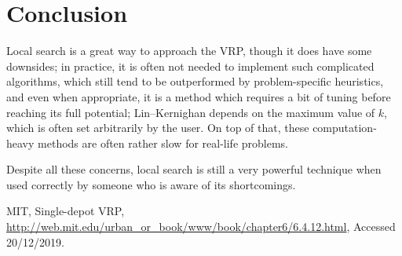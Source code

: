 \documentclass[journal]{IEEEtran}
\begin{document}
\section{Conclusion}
Local search is a great way to approach the VRP, though it does have some downsides; in practice, it is often not needed to implement such complicated algorithms, which still tend to be outperformed by problem-specific heuristics, and even when appropriate, it is a method which requires a bit of tuning before reaching its full potential; Lin--Kernighan depends on the maximum value of \(k\), which is often set arbitrarily by the user.
On top of that, these computation-heavy methods are often rather slow for real-life problems.

Despite all these concerns, local search is still a very powerful technique when used correctly by someone who is aware of its shortcomings.

\begin{thebibliography}{9}
	MIT, Single-depot VRP, \url{http://web.mit.edu/urban_or_book/www/book/chapter6/6.4.12.html}, Accessed 20/12/2019.
\end{thebibliography}
\end{document}

